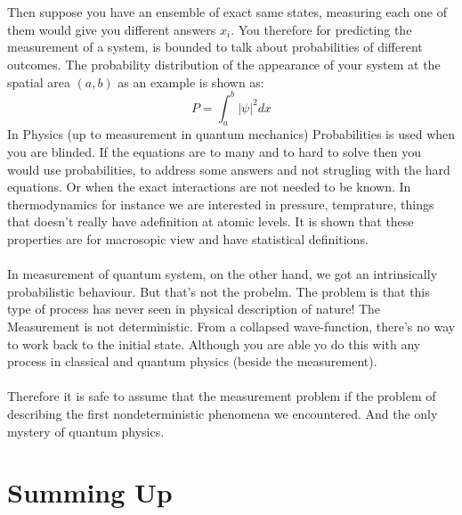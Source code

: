\documentclass[10pt,a4paper]{article}
\begin{document}
            \\
            \\
            Then suppose you have an ensemble of exact same states, measuring each one of them would give you different answers $x_i$. You therefore for predicting the measurement of a system, is bounded to talk about probabilities of different outcomes. The probability distribution of the appearance of your system at the spatial area $(a,b)$ as an example is shown as:
            \begin{equation}
                P = \int_a^b |\psi|^2 dx 
            \end{equation}
            In Physics (up to measurement in quantum mechanics) Probabilities is used when you are blinded. If the equations are to many and to hard to solve then you would use probabilities, to address some answers and not strugling with the hard equations. Or when the exact interactions are not needed to be known. In thermodynamics for instance we are interested in pressure, temprature, things that doesn't really have adefinition at atomic levels. It is shown that these properties are for macrosopic view and have statistical definitions. 
            \\
            \\
            In measurement of quantum system, on the other hand, we got an intrinsically probabilistic behaviour. But that's not the probelm. The problem is that this type of process has never seen in physical description of nature! The Measurement is not deterministic. From a collapsed wave-function, there's no way to work back to the initial state. Although you are able yo do this with any process in classical and quantum physics (beside the measurement). 
            \\
            \\
            Therefore it is safe to assume that the measurement problem if the problem of describing the first nondeterministic phenomena we encountered. And the only mystery of quantum physics.\cite{ep-qm}
    \section{Summing Up}
\end{document}
